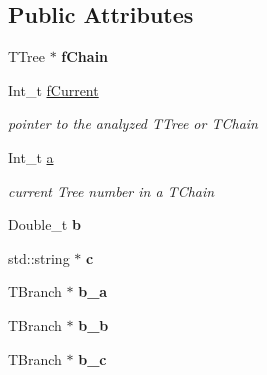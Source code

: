 \subsection*{Public Attributes}
\begin{DoxyCompactItemize}
\item 
\hypertarget{classExampleRoot_a4717cece1b2513740bf12fe1b1f269cc}{
TTree $\ast$ {\bfseries fChain}}
\label{classExampleRoot_a4717cece1b2513740bf12fe1b1f269cc}

\item 
\hypertarget{classExampleRoot_aae45e22777e3dec49bc68fae4850cf63}{
Int\_\-t \hyperlink{classExampleRoot_aae45e22777e3dec49bc68fae4850cf63}{fCurrent}}
\label{classExampleRoot_aae45e22777e3dec49bc68fae4850cf63}

\begin{DoxyCompactList}\small\item\em pointer to the analyzed TTree or TChain \item\end{DoxyCompactList}\item 
\hypertarget{classExampleRoot_a184637f032bbd33058f288c631ad4b08}{
Int\_\-t \hyperlink{classExampleRoot_a184637f032bbd33058f288c631ad4b08}{a}}
\label{classExampleRoot_a184637f032bbd33058f288c631ad4b08}

\begin{DoxyCompactList}\small\item\em current Tree number in a TChain \item\end{DoxyCompactList}\item 
\hypertarget{classExampleRoot_a906499b01132e5c5e9c220ee2e7d75dd}{
Double\_\-t {\bfseries b}}
\label{classExampleRoot_a906499b01132e5c5e9c220ee2e7d75dd}

\item 
\hypertarget{classExampleRoot_aad0a4cee176922682ae2330e1613c978}{
std::string $\ast$ {\bfseries c}}
\label{classExampleRoot_aad0a4cee176922682ae2330e1613c978}

\item 
\hypertarget{classExampleRoot_adbbc71a9b714437196324a5144ba38d6}{
TBranch $\ast$ {\bfseries b\_\-a}}
\label{classExampleRoot_adbbc71a9b714437196324a5144ba38d6}

\item 
\hypertarget{classExampleRoot_a8c1be09581a81eb61c945ee01894f078}{
TBranch $\ast$ {\bfseries b\_\-b}}
\label{classExampleRoot_a8c1be09581a81eb61c945ee01894f078}

\item 
\hypertarget{classExampleRoot_ab3c9727dc708989f36140651ec6a898c}{
TBranch $\ast$ {\bfseries b\_\-c}}
\label{classExampleRoot_ab3c9727dc708989f36140651ec6a898c}

\end{DoxyCompactItemize}
